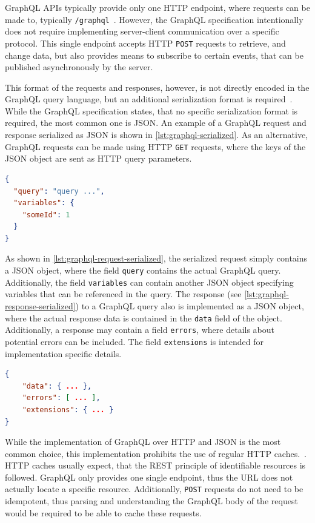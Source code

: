 GraphQL \acp{API} typically provide only one \ac{HTTP} endpoint, where requests can be made to, typically \texttt{/graphql}~\cite{Schmidt2019,Facebook2018}.
However, the GraphQL specification intentionally does not require implementing server-client communication over a specific protocol.
This single endpoint accepts \ac{HTTP} \texttt{POST} requests to retrieve, and change data, but also provides means to subscribe to certain events, that can be published asynchronously by the server.

This format of the requests and responses, however, is not directly encoded in the GraphQL query language, but an additional serialization format is required~\cite{Facebook2018}.
While the GraphQL specification states, that no specific serialization format is required, the most common one is \ac{JSON}.
An example of a GraphQL request and response serialized as \ac{JSON} is shown in \autoref{lst:graphql-serialized}.
As an alternative, GraphQL requests can be made using \ac{HTTP} \texttt{GET} requests, where the keys of the \ac{JSON} object are sent as \ac{HTTP} query parameters.

\begin{lstlisting}[language=json,caption={GraphQL Request Serialized as \ac{JSON}}, label={lst:graphql-request-serialized}]
{
  "query": "query ...",
  "variables": { 
    "someId": 1 
  }
}
\end{lstlisting}


As shown in \autoref{lst:graphql-request-serialized}, the serialized request simply contains a \ac{JSON} object, where the field \texttt{query} contains the actual GraphQL query.
Additionally, the field \texttt{variables} can contain another \ac{JSON} object specifying variables that can be referenced in the query.
The response (see \autoref{lst:graphql-response-serialized}) to a GraphQL query also is implemented as a \ac{JSON} object, where the actual response data is contained in the \texttt{data} field of the object.
Additionally, a response may contain a field \texttt{errors}, where details about potential errors can be included.
The field \texttt{extensions} is intended for implementation specific details.

\begin{lstlisting}[language=json,caption={GraphQL Response Serialized as \ac{JSON}}, label={lst:graphql-response-serialized}]
{ 
    "data": { ... },
    "errors": [ ... ],
    "extensions": { ... }
}
\end{lstlisting}

While the implementation of GraphQL over \ac{HTTP} and \ac{JSON} is the most common choice, this implementation prohibits the use of regular \ac{HTTP} caches.~\cite{GQLHTTP, RFC2068}.
\ac{HTTP} caches usually expect, that the \ac{REST} principle of identifiable resources is followed.
GraphQL only provides one single endpoint, thus the \ac{URL} does not actually locate a specific resource.
Additionally, \texttt{POST} requests do not need to be idempotent, thus parsing and understanding the GraphQL body of the request would be required to be able to cache these requests.

